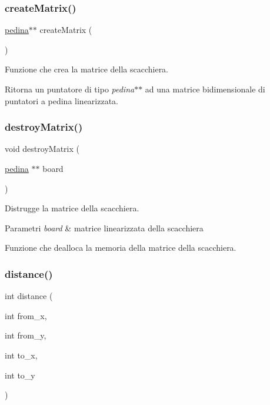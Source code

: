 \subsubsection{\texorpdfstring{create\+Matrix()}{createMatrix()}}
{\footnotesize\ttfamily \hyperlink{ml__lib_8h_a71fee95122b31f5cb0b07d9c16ffa3a5}{pedina}$\ast$$\ast$ create\+Matrix (\begin{DoxyParamCaption}{ }\end{DoxyParamCaption})}



Funzione che crea la matrice della scacchiera. 

Ritorna un puntatore di tipo {\itshape pedina$\ast$$\ast$} ad una matrice bidimensionale di puntatori a pedina linearizzata. \mbox{\label{group__Funzioni_ga898a4ffd57725b4666aa768ca71f1e1f}} 
\subsubsection{\texorpdfstring{destroy\+Matrix()}{destroyMatrix()}}
{\footnotesize\ttfamily void destroy\+Matrix (\begin{DoxyParamCaption}\item[{\hyperlink{ml__lib_8h_a71fee95122b31f5cb0b07d9c16ffa3a5}{pedina} $\ast$$\ast$}]{board }\end{DoxyParamCaption})}



Distrugge la matrice della scacchiera. 


\begin{DoxyParams}{Parametri}
{\em board} & matrice linearizzata della scacchiera\\
\hline
\end{DoxyParams}
Funzione che dealloca la memoria della matrice della scacchiera. \mbox{\label{group__Funzioni_gadd69249d37e4dbcc03785bacd32d073b}} 
\subsubsection{\texorpdfstring{distance()}{distance()}}
{\footnotesize\ttfamily int distance (\begin{DoxyParamCaption}\item[{int}]{from\+\_\+x,  }\item[{int}]{from\+\_\+y,  }\item[{int}]{to\+\_\+x,  }\item[{int}]{to\+\_\+y }\end{DoxyParamCaption})}



